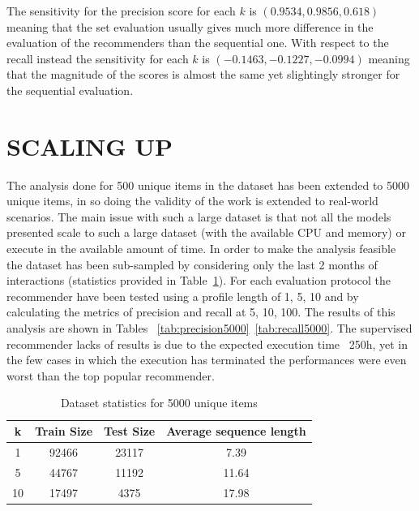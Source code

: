 \documentclass[prodmode,acmtecs]{acmsmall} %
\begin{document}
The sensitivity for the precision score for each $k$ is $(0.9534,  0.9856,  0.618)$ meaning that the set evaluation usually gives much more difference in the evaluation of the recommenders than the sequential one. With respect to the recall instead the sensitivity for each $k$ is $(-0.1463, -0.1227, -0.0994)$ meaning that the magnitude of the scores is almost the same yet slightingly stronger for the sequential evaluation.

\section{SCALING UP}
The analysis done for 500 unique items in the dataset has been extended to 5000 unique items, in so doing the validity of the work is extended to real-world scenarios. The main issue with such a large dataset is that not all the models presented scale to such a large dataset (with the available CPU and memory) or execute in the available amount of time. In order to make the analysis feasible the dataset has been sub-sampled by considering only the last 2 months of interactions (statistics provided in Table~\ref{data5000}).
For each evaluation protocol the recommender have been tested using a profile length of 1, 5, 10 and by calculating the metrics of precision and recall at 5, 10, 100. The results of this analysis are shown in Tables ~\ref{tab:precision5000}~\ref{tab:recall5000}.
The supervised recommender lacks of results is due to the expected execution time ~250h, yet in the few cases in which the execution has terminated the performances were even worst than the top popular recommender.

\begin{table}[H]
	\centering
	\caption{Dataset statistics for 5000 unique items}
	\label{data5000}
	\begin{tabular}{|c|c|c|c|}
		\hline
		\textbf{k} & \textbf{Train Size} & \textbf{Test Size} & \textbf{Average sequence length} \\ \hline
		1          & 92466              & 23117              & 7.39                           \\ \hline
		5          & 44767               & 11192               & 11.64                            \\ \hline
		10         & 17497                & 4375               & 17.98                          \\ \hline
	\end{tabular}
\end{table}
\end{document}
